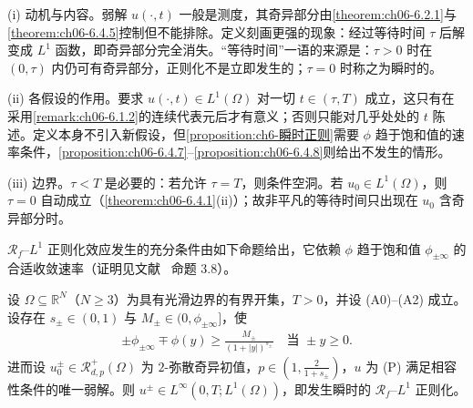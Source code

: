 \documentclass[../../main.tex]{subfiles}%
\begin{document}
\begin{remark}\label{remark:ch06-RfL1动机}
(i) 动机与内容。弱解 $u(\cdot,t)$ 一般是测度，其奇异部分由\cref{theorem:ch06-6.2.1}与\cref{theorem:ch06-6.4.5}控制但不能排除。定义刻画更强的现象：经过等待时间 $\tau$ 后解变成 $L^1$ 函数，即奇异部分完全消失。“等待时间”一语的来源是：$\tau>0$ 时在 $(0,\tau)$ 内仍可有奇异部分，正则化不是立即发生的；$\tau=0$ 时称之为瞬时的。

(ii) 各假设的作用。要求 $u(\cdot,t)\in L^1(\Omega)$ 对一切 $t\in(\tau,T)$ 成立，这只有在采用\cref{remark:ch06-6.1.2}的连续代表元后才有意义；否则只能对几乎处处的 $t$ 陈述。定义本身不引入新假设，但\cref{proposition:ch6-瞬时正则}需要 $\phi$ 趋于饱和值的速率条件，\cref{proposition:ch06-6.4.7}--\cref{proposition:ch06-6.4.8}则给出不发生的情形。

(iii) 边界。$\tau<T$ 是必要的：若允许 $\tau=T$，则条件空洞。若 $u_0\in L^1(\Omega)$，则 $\tau=0$ 自动成立（\cref{theorem:ch06-6.4.1}(ii)）；故非平凡的等待时间只出现在 $u_0$ 含奇异部分时。
\end{remark}

$\mathscr{R}_f$--$L^1$ 正则化效应发生的充分条件由如下命题给出，它依赖 $\phi$ 趋于饱和值 $\phi_{\pm\infty}$ 的合适收敛速率（证明见文献~\cite{ref87} 命题 3.8）。
\begin{proposition}\label{proposition:ch6-瞬时正则}
设 $\Omega\subseteq\mathbb{R}^N$（$N\geqslant3$）为具有光滑边界的有界开集，$T>0$，并设 (A0)--(A2) 成立。设存在 $s_\pm\in(0,1)$ 与 $M_\pm\in(0,\phi_{\pm\infty}]$，使
\begin{align}
\pm\phi_{\pm\infty}\mp\phi(y)\geqslant\frac{M_\pm}{(1+|y|)^{s_\pm}}
\quad\text{当 }\pm y\geqslant0. \label{align:ch6-6.38}
\end{align}
进而设 $u^\pm_0\in\mathscr{R}^+_{d,p}(\Omega)$ 为 $2$-弥散奇异初值，$p\in(1,\frac{2}{1+s_\pm})$，$u$ 为 (P) 满足相容性条件的唯一弱解。则 $u^\pm\in L^\infty(0,T;L^1(\Omega))$，即发生瞬时的 $\mathscr{R}_f$--$L^1$ 正则化。
\end{proposition}
\end{document}
